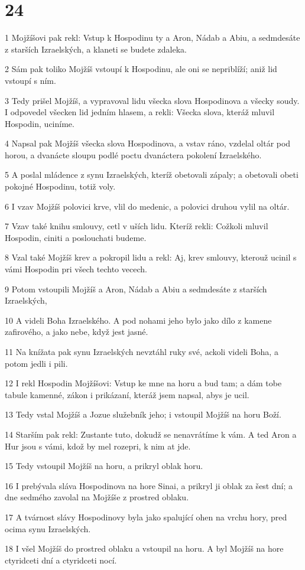 \chapter{24}

\par 1 Mojžíšovi pak rekl: Vstup k Hospodinu ty a Aron, Nádab a Abiu, a sedmdesáte z starších Izraelských, a klaneti se budete zdaleka.
\par 2 Sám pak toliko Mojžíš vstoupí k Hospodinu, ale oni se nepriblíží; aniž lid vstoupí s ním.
\par 3 Tedy prišel Mojžíš, a vypravoval lidu všecka slova Hospodinova a všecky soudy. I odpovedel všecken lid jedním hlasem, a rekli: Všecka slova, kteráž mluvil Hospodin, uciníme.
\par 4 Napsal pak Mojžíš všecka slova Hospodinova, a vstav ráno, vzdelal oltár pod horou, a dvanácte sloupu podlé poctu dvanáctera pokolení Izraelského.
\par 5 A poslal mládence z synu Izraelských, kteríž obetovali zápaly; a obetovali obeti pokojné Hospodinu, totiž voly.
\par 6 I vzav Mojžíš polovici krve, vlil do medenic, a polovici druhou vylil na oltár.
\par 7 Vzav také knihu smlouvy, cetl v uších lidu. Kteríž rekli: Cožkoli mluvil Hospodin, ciniti a poslouchati budeme.
\par 8 Vzal také Mojžíš krev a pokropil lidu a rekl: Aj, krev smlouvy, kterouž ucinil s vámi Hospodin pri všech techto vecech.
\par 9 Potom vstoupili Mojžíš a Aron, Nádab a Abiu a sedmdesáte z starších Izraelských,
\par 10 A videli Boha Izraelského. A pod nohami jeho bylo jako dílo z kamene zafirového, a jako nebe, když jest jasné.
\par 11 Na knížata pak synu Izraelských nevztáhl ruky své, ackoli videli Boha, a potom jedli i pili.
\par 12 I rekl Hospodin Mojžíšovi: Vstup ke mne na horu a bud tam; a dám tobe tabule kamenné, zákon i prikázaní, kteráž jsem napsal, abys je ucil.
\par 13 Tedy vstal Mojžíš a Jozue služebník jeho; i vstoupil Mojžíš na horu Boží.
\par 14 Starším pak rekl: Zustante tuto, dokudž se nenavrátíme k vám. A ted Aron a Hur jsou s vámi, kdož by mel rozepri, k nim at jde.
\par 15 Tedy vstoupil Mojžíš na horu, a prikryl oblak horu.
\par 16 I prebývala sláva Hospodinova na hore Sinai, a prikryl ji oblak za šest dní; a dne sedmého zavolal na Mojžíše z prostred oblaku.
\par 17 A tvárnost slávy Hospodinovy byla jako spalující ohen na vrchu hory, pred ocima synu Izraelských.
\par 18 I všel Mojžíš do prostred oblaku a vstoupil na horu. A byl Mojžíš na hore ctyridceti dní a ctyridceti nocí.

